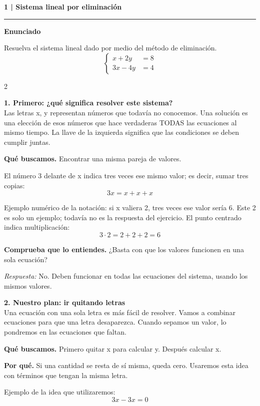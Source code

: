 \documentclass[11pt,a4paper,landscape]{article}
\newcommand{\titulo}[1]{{\LARGE\bfseries #1}\par\smallskip\hrule\medskip}
\begin{document}
\titulo{1 | Sistema lineal por eliminación}
\textbf{Enunciado}\par Resuelva el sistema lineal dado por medio del método de eliminación.
\[\left\{\begin{aligned}x + 2y &= 8\\3x - 4y &= 4\end{aligned}\right.\]
\begin{multicols*}{2}
\noindent\begin{minipage}{\linewidth}\textbf{1. Primero: ¿qué significa resolver este sistema?}\\[2pt]Las letras x, y representan números que todavía no conocemos. Una solución es una elección de esos números que hace verdaderas TODAS las ecuaciones al mismo tiempo. La llave de la izquierda significa que las condiciones se deben cumplir juntas.
\par\smallskip\textbf{Qué buscamos.} Encontrar una misma pareja de valores.
\par\smallskip El número 3 delante de x indica tres veces ese mismo valor; es decir, sumar tres copias:
\[3x=x+x+x\]
\par\smallskip Ejemplo numérico de la notación: si x valiera 2, tres veces ese valor sería 6. Este 2 es solo un ejemplo; todavía no es la respuesta del ejercicio. El punto centrado indica multiplicación:
\[3\cdot 2=2+2+2=6\]
\par\smallskip\textbf{Comprueba que lo entiendes.} ¿Basta con que los valores funcionen en una sola ecuación?\par\textit{Respuesta:} No. Deben funcionar en todas las ecuaciones del sistema, usando los mismos valores.
\end{minipage}\par\medskip
\noindent\begin{minipage}{\linewidth}\textbf{2. Nuestro plan: ir quitando letras}\\[2pt]Una ecuación con una sola letra es más fácil de resolver. Vamos a combinar ecuaciones para que una letra desaparezca. Cuando sepamos un valor, lo pondremos en las ecuaciones que faltan.
\par\smallskip\textbf{Qué buscamos.} Primero quitar x para calcular y. Después calcular x.
\par\smallskip\textbf{Por qué.} Si una cantidad se resta de sí misma, queda cero. Usaremos esta idea con términos que tengan la misma letra.
\par\smallskip Ejemplo de la idea que utilizaremos:
\[3x-3x=0\]

\end{minipage}
\end{multicols*}
\end{document}
